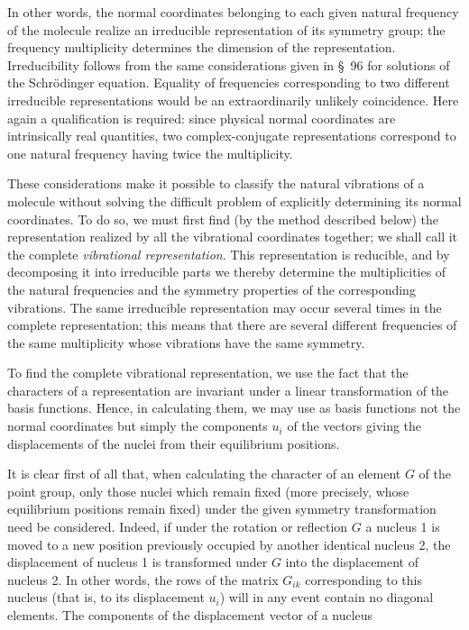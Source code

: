 In other words, the normal coordinates belonging to each given natural frequency of the molecule realize an irreducible representation of its symmetry group; the frequency multiplicity determines the dimension of the representation. Irreducibility follows from the same considerations given in \S~96 for solutions of the Schrödinger equation. Equality of frequencies corresponding to two different irreducible representations would be an extraordinarily unlikely coincidence. Here again a qualification is required: since physical normal coordinates are intrinsically real quantities, two complex-conjugate representations correspond to one natural frequency having twice the multiplicity.

These considerations make it possible to classify the natural vibrations of a molecule without solving the difficult problem of explicitly determining its normal coordinates. To do so, we must first find (by the method described below) the representation realized by all the vibrational coordinates together; we shall call it the complete \emph{vibrational representation}. This representation is reducible, and by decomposing it into irreducible parts we thereby determine the multiplicities of the natural frequencies and the symmetry properties of the corresponding vibrations. The same irreducible representation may occur several times in the complete representation; this means that there are several different frequencies of the same multiplicity whose vibrations have the same symmetry.

To find the complete vibrational representation, we use the fact that the characters of a representation are invariant under a linear transformation of the basis functions. Hence, in calculating them, we may use as basis functions not the normal coordinates but simply the components $u_i$ of the vectors giving the displacements of the nuclei from their equilibrium positions.

It is clear first of all that, when calculating the character of an element $G$ of the point group, only those nuclei which remain fixed (more precisely, whose equilibrium positions remain fixed) under the given symmetry transformation need be considered. Indeed, if under the rotation or reflection $G$ a nucleus 1 is moved to a new position previously occupied by another identical nucleus 2, the displacement of nucleus 1 is transformed under $G$ into the displacement of nucleus 2. In other words, the rows of the matrix $G_{ik}$ corresponding to this nucleus (that is, to its displacement $u_i$) will in any event contain no diagonal elements. The components of the displacement vector of a nucleus

